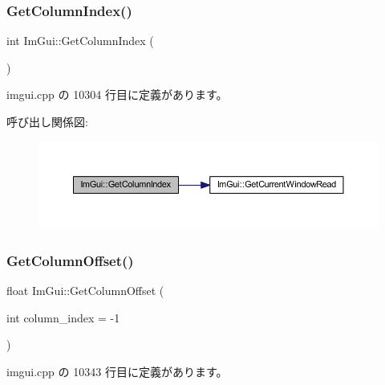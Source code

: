 \subsubsection{\texorpdfstring{Get\+Column\+Index()}{GetColumnIndex()}}
{\footnotesize\ttfamily int Im\+Gui\+::\+Get\+Column\+Index (\begin{DoxyParamCaption}{ }\end{DoxyParamCaption})}



 imgui.\+cpp の 10304 行目に定義があります。

呼び出し関係図\+:\nopagebreak
\begin{figure}[H]
\begin{center}
\leavevmode
\includegraphics[width=350pt]{namespace_im_gui_acc31f8eea4fcfb86edeb3ac12d82fc05_cgraph}
\end{center}
\end{figure}
\mbox{\label{namespace_im_gui_a79c22e9c5c208b6c9534a273be71a9e6}} 
\subsubsection{\texorpdfstring{Get\+Column\+Offset()}{GetColumnOffset()}}
{\footnotesize\ttfamily float Im\+Gui\+::\+Get\+Column\+Offset (\begin{DoxyParamCaption}\item[{int}]{column\+\_\+index = {\ttfamily -\/1} }\end{DoxyParamCaption})}



 imgui.\+cpp の 10343 行目に定義があります。

